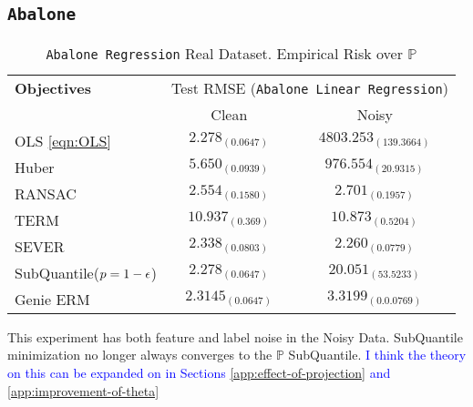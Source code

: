 \documentclass{article} %
\newcommand{\subhead}[1]{\multicolumn{1}{c}{#1}}%
\begin{document}
\begin{appendices}
	\subsection{\texttt{Abalone}}
	\begin{table}[!h]
		\centering
		\begin{tabular}{lcc}
			\toprule 
			\textbf{Objectives}&\multicolumn{2}{c}{Test RMSE (\texttt{Abalone Linear Regression})}\\                   
			\cmidrule(rl){2-3}
			&\subhead{Clean}& \subhead{Noisy}\\ 
			\midrule
			OLS \ref{eqn:OLS}  &$2.278_{(0.0647)}$&$4803.253_{(139.3664)}$\\
			Huber \cite{Huber2009} &$5.650_{(0.0939)}$&$976.554_{(20.9315)}$\\
			RANSAC \cite{RANSAC1981} &$2.554_{(0.1580)}$&$2.701_{(0.1957)}$\\
			TERM \cite{li2020tilted} &$10.937_{(0.369)}$&$10.873_{(0.5204)}$\\
			SEVER \cite{DiakonikolasKKLSS19} &$2.338_{(0.0803)}$&$\mathbf{2.260_{(0.0779)}}$\\
			\rowcolor{LightCyan}
			SubQuantile($p = 1-{\epsilon}$) &$\mathbf{2.278_{(0.0647)}}$&$20.051_{(53.5233)}$\\
			\midrule 
			Genie ERM &$2.3145_{(0.0647)}$&$3.3199_{(0.0.0769)}$\\
			\bottomrule
		\end{tabular}
		\caption{\texttt{Abalone Regression} Real Dataset. Empirical Risk over $\mathbb{P}$}
		\label{tab:abalone-regression}
	\end{table}
	This experiment has both feature and label noise in the Noisy Data. SubQuantile minimization no longer always converges to the $\mathbb{P}$ SubQuantile. \textcolor{blue}{I think the theory on this can be expanded on in Sections \ref{app:effect-of-projection} and \ref{app:improvement-of-theta}}
	

\end{appendices}
\end{document}
